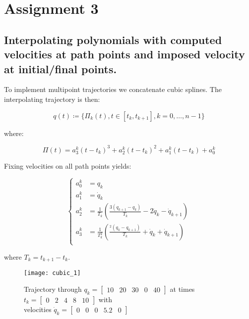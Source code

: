 \section{Assignment 3}
\subsection{Interpolating polynomials with computed velocities at path points and imposed velocity at initial/final points.}

To implement multipoint trajectories we concatenate cubic splines. The interpolating trajectory is then:

\begin{equation*}
q(t)\coloneqq\{\Pi_k(t),t\in[t_k,t_{k+1}],k=0,\dots,n-1\}
\end{equation*}

where:

\begin{equation*}
\Pi(t)=a_3^k(t-t_k)^3+a_2^k(t-t_k)^2+a_1^k(t-t_k)+a_0^k
\end{equation*}

Fixing velocities on all path points yields:

\begin{equation*}
\begin{cases}
a_0^k&=q_k\\
a_1^k&=\dot q_k\\
a_2^k&=\frac{1}{T_k}\left(\frac{3(q_{k+1}-q_k)}{T_k}-2\dot q_k-\dot q_{k+1}\right)\\
a_3^k&=\frac{1}{T_k^2}\left(\frac{^2(q_{k}-q_{k+1})}{T_k}+\dot q_k+\dot q_{k+1}\right)\\
\end{cases}
\end{equation*}

where $T_k=t_{k+1}-t_k$.

\begin{figure}[h]
\centering
\texttt{[image: cubic\_1]}
\caption{Trajectory through $q_k=\begin{bmatrix}
10 & 20 & 30 & 0 & 40
\end{bmatrix}$ at times $t_k=\begin{bmatrix}
0 & 2 & 4 & 8 & 10
\end{bmatrix}$ with \\velocities $\dot q_k=\begin{bmatrix}
0 & 0 & 0 & 5.2 & 0
\end{bmatrix}$}
\end{figure}

